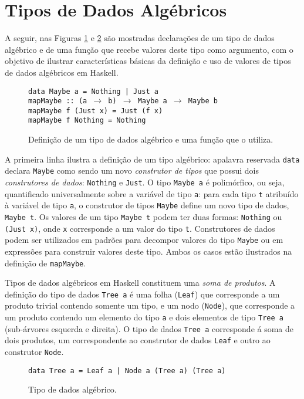 \section{Tipos de Dados Alg\'ebricos}

A seguir, nas Figuras \ref{fig3} e \ref{fig4} s\~ao mostradas declara\c{c}\~oes
de um tipo de dados alg\'ebrico e de uma fun\c{c}\~ao que recebe valores deste tipo como
argumento, com o objetivo de ilustrar caracter\'isticas b\'asicas da defini\c{c}\~ao e 
uso de valores de tipos de dados alg\'ebricos em Haskell.
\begin{figure}[h]
\begin{flushleft}
  \texttt{data Maybe a = Nothing | Just a}\\
  \texttt{mapMaybe :: (a $\rightarrow$ b) $\rightarrow$ Maybe a $\rightarrow$ Maybe b}\\
  \texttt{mapMaybe f (Just x) = Just (f x)}\\
  \texttt{mapMaybe f Nothing = Nothing}\\
\end{flushleft}
  \caption{Defini\c{c}\~ao de um tipo de dados alg\'ebrico e uma fun\c{c}\~ao que o
  utiliza.}
  \label{fig3}
\end{figure}

A primeira linha ilustra a defini\c{c}\~ao de um tipo alg\'ebrico: apalavra reservada \texttt{data} 
declara \texttt{Maybe} como sendo um novo 
\emph{construtor de tipos} que possui dois \emph{construtores de dados}: \texttt{Nothing} 
e \texttt{Just}. O tipo \texttt{Maybe a} \'e polim\'orfico, ou seja, quantificado universalmente sobre a vari\'avel de
tipo \texttt{a}: para cada tipo \texttt{t} atribu\'ido \`a vari\'avel de tipo
\texttt{a}, o construtor de tipos \texttt{Maybe} define um novo tipo de dados, \texttt{Maybe t}. 
Os valores de um tipo \texttt{Maybe t} 
podem ter duas formas: \texttt{Nothing} ou \texttt{(Just x)}, onde \texttt{x} corresponde 
a um valor do tipo \texttt{t}. Construtores de dados podem ser utilizados em
padr\~oes para decompor valores do tipo \texttt{Maybe} ou em express\~oes para
construir valores deste tipo. Ambos os casos est\~ao ilustrados na
defini\c{c}\~ao de \texttt{mapMaybe}.

Tipos de dados alg\'ebricos em Haskell constituem uma \emph{soma de produtos}.
A defini\c{c}\~ao do tipo de dados \texttt{Tree a} \'e uma folha (\texttt{Leaf})
que corresponde a um produto trivial contendo somente um tipo, e um nodo (\texttt{Node}), que corresponde a
um produto contendo um elemento do tipo \texttt{a} e dois elementos de tipo \texttt{Tree a} (sub-\'arvores esquerda 
e direita). 
O tipo de dados \texttt{Tree a} corresponde \'a soma de dois produtos, um correspondente ao 
construtor de dados \texttt{Leaf} e outro ao construtor \texttt{Node}.
\begin{figure}[h]
  \begin{flushleft}
     \texttt{data Tree a = Leaf a | Node a (Tree a) (Tree a)}
  \end{flushleft}
  \caption{Tipo de dados alg\'ebrico.}
  \label{fig4}
\end{figure}

